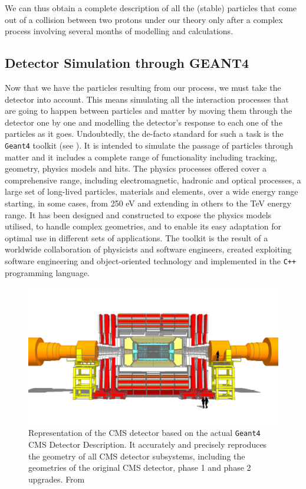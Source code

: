 We can thus obtain a complete description of all the (stable) particles that come out of a collision between two protons under our theory only after a complex process involving several months of modelling and calculations.

\subsection{Detector Simulation through GEANT4}

Now that we have the particles resulting from our process, we must take the detector into account. This means simulating all the interaction processes that are going to happen between particles and matter by moving them through the detector one by one and modelling the detector’s response to each one of the particles as it goes. 
Undoubtedly, the de-facto standard for such a task is the \texttt{Geant4} toolkit (see \cite{AGOSTINELLI2003250}). It is intended to simulate the passage of particles through matter and it includes a complete range of functionality including tracking, geometry, physics models and hits. The physics processes offered cover a comprehensive range, including electromagnetic, hadronic and optical processes, a large set of long-lived particles, materials and elements, over a wide energy range starting, in some cases, from 250 eV and extending in others to the TeV energy range. It has been designed and constructed to expose the physics models utilised, to handle complex geometries, and to enable its easy adaptation for optimal use in different sets of applications. The toolkit is the result of a worldwide collaboration of physicists and software engineers, created exploiting software engineering and object-oriented technology and implemented in the \texttt{C++} programming language.

\begin{figure}
    \centering
     \includegraphics[width=\columnwidth]{gfx/ch2/cms_160518_01_Scene_2.png}
    \caption[CMS model]{ Representation of the CMS detector based on the actual \texttt{Geant4} CMS Detector Description. It accurately and precisely reproduces the geometry of all CMS detector subsystems, including the geometries of the original CMS detector, phase 1 and phase 2 upgrades.  From \cite{decmod}}
    \label{fig:decmod}
\end{figure}


